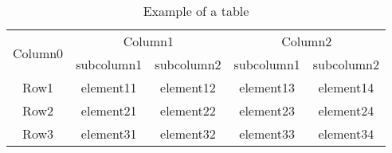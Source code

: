 \documentclass[print, doctor, vlined]{DissertUESTC}
\begin{document}
	\begin{table}[htp]
		\captionsetup{list=no}%
		\caption{Example of a table}
		\begin{tabular}{ccccc}
			\toprule
			\multirow{2}{*}{Column0} &  \multicolumn{2}{c}{Column1\tnote{1}} & \multicolumn{2}{c}{Column2\tnote{2}} \\
			\cmidrule(lr){2-3}\cmidrule(l){4-5}
			~     & subcolumn1 & subcolumn2 & subcolumn1 & subcolumn2 \\
			\midrule
			Row1  & element11 & element12 &element13 & element14 \\
			Row2  & element21 & element22 &element23 & element24 \\
			\cmidrule{2-3}\cmidrule{4-5}
			Row3  & element31 & element32 &element33 & element34 \\
			\bottomrule
		\end{tabular}
	\end{table}




\end{document}
